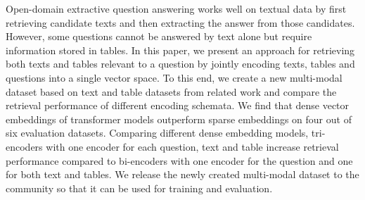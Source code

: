 Open-domain extractive question answering works well on textual data by first retrieving candidate texts and then extracting the answer from those candidates. However, some questions cannot be answered by text alone but require information stored in tables. In this paper, we present an approach for retrieving both texts and tables relevant to a question by jointly encoding texts, tables and questions into a single vector space. To this end, we create a new multi-modal dataset based on text and table datasets from related work and compare the retrieval performance of different encoding schemata. We find that dense vector embeddings of transformer models outperform sparse embeddings on four out of six evaluation datasets. Comparing different dense embedding models, tri-encoders with one encoder for each question, text and table increase retrieval performance compared to bi-encoders with one encoder for the question and one for both text and tables. We release the newly created multi-modal dataset to the community so that it can be used for training and evaluation.
